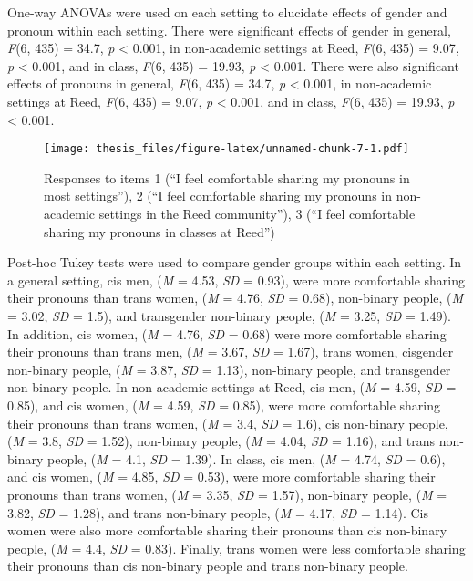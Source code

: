 \documentclass[12pt,twoside]{reedthesis}
\begin{document}
One-way ANOVAs were used on each setting to elucidate effects of gender and pronoun within each setting. There were significant effects of gender in general, \emph{F}(6, 435) = 34.7, \emph{p} \textless{} 0.001, in non-academic settings at Reed, \emph{F}(6, 435) = 9.07, \emph{p} \textless{} 0.001, and in class, \emph{F}(6, 435) = 19.93, \emph{p} \textless{} 0.001. There were also significant effects of pronouns in general, \emph{F}(6, 435) = 34.7, \emph{p} \textless{} 0.001, in non-academic settings at Reed, \emph{F}(6, 435) = 9.07, \emph{p} \textless{} 0.001, and in class, \emph{F}(6, 435) = 19.93, \emph{p} \textless{} 0.001.
\begin{figure}
\centering
\texttt{[image: thesis\_files/figure-latex/unnamed-chunk-7-1.pdf]}
\caption{\label{fig:unnamed-chunk-7}Responses to items 1 (``I feel comfortable sharing my pronouns in most settings''), 2 (``I feel comfortable sharing my pronouns in non-academic settings in the Reed community''), 3 (``I feel comfortable sharing my pronouns in classes at Reed'')}
\end{figure}
Post-hoc Tukey tests were used to compare gender groups within each setting. In a general setting, cis men, (\emph{M} = 4.53, \emph{SD} = 0.93), were more comfortable sharing their pronouns than trans women, (\emph{M} = 4.76, \emph{SD} = 0.68), non-binary people, (\emph{M} = 3.02, \emph{SD} = 1.5), and transgender non-binary people, (\emph{M} = 3.25, \emph{SD} = 1.49). In addition, cis women, (\emph{M} = 4.76, \emph{SD} = 0.68) were more comfortable sharing their pronouns than trans men, (\emph{M} = 3.67, \emph{SD} = 1.67), trans women, cisgender non-binary people, (\emph{M} = 3.87, \emph{SD} = 1.13), non-binary people, and transgender non-binary people. In non-academic settings at Reed, cis men, (\emph{M} = 4.59, \emph{SD} = 0.85), and cis women, (\emph{M} = 4.59, \emph{SD} = 0.85), were more comfortable sharing their pronouns than trans women, (\emph{M} = 3.4, \emph{SD} = 1.6), cis non-binary people, (\emph{M} = 3.8, \emph{SD} = 1.52), non-binary people, (\emph{M} = 4.04, \emph{SD} = 1.16), and trans non-binary people, (\emph{M} = 4.1, \emph{SD} = 1.39). In class, cis men, (\emph{M} = 4.74, \emph{SD} = 0.6), and cis women, (\emph{M} = 4.85, \emph{SD} = 0.53), were more comfortable sharing their pronouns than trans women, (\emph{M} = 3.35, \emph{SD} = 1.57), non-binary people, (\emph{M} = 3.82, \emph{SD} = 1.28), and trans non-binary people, (\emph{M} = 4.17, \emph{SD} = 1.14). Cis women were also more comfortable sharing their pronouns than cis non-binary people, (\emph{M} = 4.4, \emph{SD} = 0.83). Finally, trans women were less comfortable sharing their pronouns than cis non-binary people and trans non-binary people.
\end{document}
